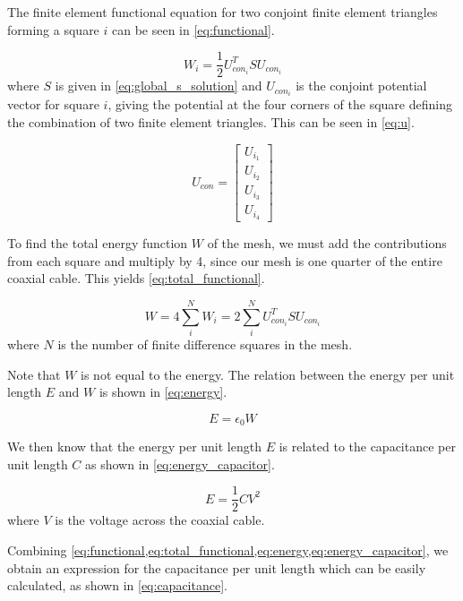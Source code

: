 \documentclass[a4paper,titlepage]{article}
\begin{document}
	The finite element functional equation for two conjoint finite element triangles forming a square $i$ can be seen in \cref{eq:functional}.
	
	\begin{equation} \label{eq:functional}
		W_i = \frac{1}{2} U_{con_i}^T S U_{con_i}
	\end{equation}
	where $S$ is given in \cref{eq:global_s_solution} and $U_{con_i}$ is the conjoint potential vector for square $i$, giving the potential at the four corners of the square defining the combination of two finite element triangles. This can be seen in \cref{eq:u}.
	
	\begin{equation} \label{eq:u}
		U_{con} = 
			\begin{bmatrix}
				U_{i_1} \\
				U_{i_2} \\
				U_{i_3} \\
				U_{i_4}
			\end{bmatrix}
	\end{equation}
	
	To find the total energy function $W$ of the mesh, we must add the contributions from each square and multiply by 4, since our mesh is one quarter of the entire coaxial cable. This yields \cref{eq:total_functional}.
	
	\begin{equation} \label{eq:total_functional}
		W = 4 \sum_{i}^{N}{W_i} = 2 \sum_{i}^{N}{U_{con_i}^T S U_{con_i}}
	\end{equation} 
	where $N$ is the number of finite difference squares in the mesh.
	
	Note that $W$ is not equal to the energy. The relation between the energy per unit length $E$ and $W$ is shown in \cref{eq:energy}.
	
	\begin{equation} \label{eq:energy}
		E = \epsilon_0 W
	\end{equation}
	
	We then know that the energy per unit length $E$ is related to the capacitance per unit length $C$ as shown in \cref{eq:energy_capacitor}.
	
	\begin{equation} \label{eq:energy_capacitor}
		E = \frac{1}{2} C V^2
	\end{equation}
	where $V$ is the voltage across the coaxial cable.
	
	Combining \cref{eq:functional,eq:total_functional,eq:energy,eq:energy_capacitor}, we obtain an expression for the capacitance per unit length which can be easily calculated, as shown in \autoref{eq:capacitance}.
	
\end{document}
